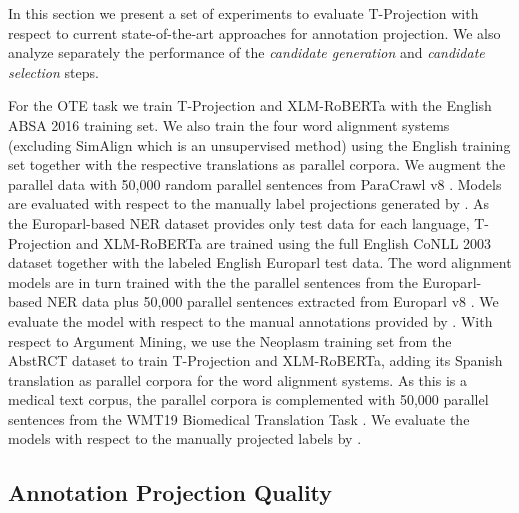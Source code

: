 \documentclass[11pt]{article}
\begin{document}
In this section we present a set of experiments to evaluate 
 T-Projection with respect to current state-of-the-art approaches for annotation projection. We also analyze separately the performance of the \emph{candidate generation} and \emph{candidate selection}
steps. 

For the OTE task we train T-Projection and XLM-RoBERTa with the English
ABSA 2016 training set. We also train the four word alignment systems (excluding SimAlign which is an
unsupervised method) using the English training set together with the respective
translations as parallel corpora. We augment the parallel data with 50,000
random parallel sentences from ParaCrawl v8 \cite{espla-etal-2019-paracrawl}. Models are evaluated with respect to the manually label projections generated by \citet{garcia-ferrero-etal-2022-model}. 
As the Europarl-based NER dataset \cite{agerri-etal-2018-building} provides
only test data for each language, T-Projection and XLM-RoBERTa are trained
using the full English CoNLL 2003 dataset
\cite{tjong-kim-sang-de-meulder-2003-introduction} together with the labeled
English Europarl test data. The word alignment models are in turn trained with
the the parallel sentences from the Europarl-based NER data plus 50,000
parallel sentences extracted from Europarl v8 \cite{DBLP:conf/mtsummit/Koehn05}. We evaluate the model with respect to the manual annotations provided by \citet{agerri-etal-2018-building}.
With respect to Argument Mining, we use the Neoplasm training set from the
AbstRCT dataset to train T-Projection and XLM-RoBERTa, adding its Spanish translation as parallel
corpora for the word alignment systems. As this is a medical text corpus, the
parallel corpora is complemented with 50,000 parallel sentences
from the WMT19 Biomedical Translation Task \cite{bawden-etal-2019-findings}. We evaluate the models with respect to the manually projected labels by \citet{DBLP:journals/corr/abs-2301-10527}.










\subsection{Annotation Projection Quality}
\end{document}
